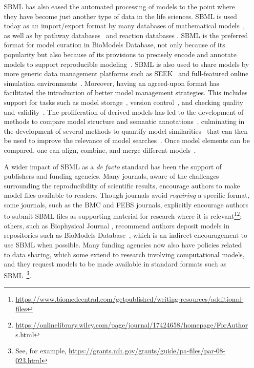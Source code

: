 \documentclass{sbml-paper}
\begin{document}
SBML has also eased the automated processing of models to the point where they have become just another type of data in the life sciences.  SBML is used today as an import/export format by many databases of mathematical models~\citep{chelliah2014biomodels, Norsigian2019, Misirli2014composable}, as well as by pathway databases~\citep{caspi2015metacyc, mi_2016, fabregat2017reactome} and reaction databases \citep{ganter2013metanetx, wittig2017sabio}.  SBML is the preferred format for model curation in BioModels Database, not only because of its popularity but also because of its provisions to precisely encode and annotate models to support reproducible modeling~\citep{chelliah2009data}.  SBML is also used to share models by more generic data management platforms such as SEEK~\citep{wolstencroft2016fairdomhub, stanford2019data} and full-featured online simulation environments~\citep[e.g.,][]{Moraru2008virtual, Safranek2011ephotosynthesis, peters2017jws, Weidemann2008sycamore, Lee2009webbased}.  Moreover, having an agreed-upon format has facilitated the introduction of better model management strategies.  This includes support for tasks such as model storage~\citep{Henkel2015combininga}, version control~\citep{Scharm2016algorithm}, and checking quality and validity~\citep{Liebermeister2008validity}.  The proliferation of derived models has led to the development of methods to compare model structure and semantic annotations~\citep{Lambusch2018identifying}, culminating in the development of several methods to quantify model similarities~\citep{henkel2016notions} that can then be used to improve the relevance of model searches~\citep{schulz2011retrieval,henkel2010ranked}.  Once model elements can be compared, one can align, combine, and merge different models~\citep{krause2010annotation}.
 
A wider impact of SBML as a \emph{de facto} standard has been the support of publishers and funding agencies.  Many journals, aware of the challenges surrounding the reproducibility of scientific results, encourage authors to make model files available to readers.  Though journals avoid \emph{requiring} a specific format, some journals, such as the BMC and FEBS journals, explicitly encourage authors to submit SBML files as supporting material for research where it is relevant\footnote{\url{https://www.biomedcentral.com/getpublished/writing-resources/additional-files}}\footnote{\url{https://onlinelibrary.wiley.com/page/journal/17424658/homepage/ForAuthors.html}}; others, such as Biophysical Journal \citep{nickerson2017introducing}, recommend authors deposit models in repositories such as BioModels Database~\citep{chelliah2014biomodels}, which is an indirect encouragement to use SBML when possible.  Many funding agencies now also have policies related to data sharing, which some extend to research involving computational models, and they request models to be made available in standard formats such as SBML~\footnote{See, for example, \url{https://grants.nih.gov/grants/guide/pa-files/par-08-023.html}}.
\end{document}
